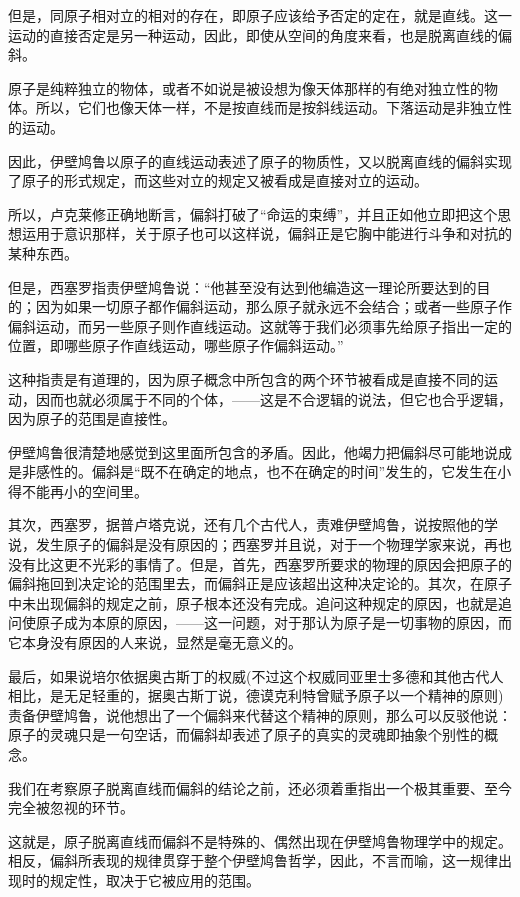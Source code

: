 \documentclass[a4paper,twoside,12pt,AutoFakeBold]{ctexart}
\begin{document}
但是，同原子相对立的相对的存在，即原子应该给予否定的定在，就是直线。这一运动的直接否定是另一种运动，因此，即使从空间的角度来看，也是脱离直线的偏斜。

原子是纯粹独立的物体，或者不如说是被设想为像天体那样的有绝对独立性的物体。所以，它们也像天体一样，不是按直线而是按斜线运动。下落运动是非独立性的运动。

因此，伊壁鸠鲁以原子的直线运动表述了原子的物质性，又以脱离直线的偏斜实现了原子的形式规定，而这些对立的规定又被看成是直接对立的运动。

所以，卢克莱修正确地断言，偏斜打破了“命运的束缚”，并且正如他立即把这个思想运用于意识那样，关于原子也可以这样说，偏斜正是它胸中能进行斗争和对抗的某种东西。

但是，西塞罗指责伊壁鸠鲁说：“他甚至没有达到他编造这一理论所要达到的目的；因为如果一切原子都作偏斜运动，那么原子就永远不会结合；或者一些原子作偏斜运动，而另一些原子则作直线运动。这就等于我们必须事先给原子指出一定的位置，即哪些原子作直线运动，哪些原子作偏斜运动。”

这种指责是有道理的，因为原子概念中所包含的两个环节被看成是直接不同的运动，因而也就必须属于不同的个体，——这是不合逻辑的说法，但它也合乎逻辑，因为原子的范围是直接性。

伊壁鸠鲁很清楚地感觉到这里面所包含的矛盾。因此，他竭力把偏斜尽可能地说成是非感性的。偏斜是“既不在确定的地点，也不在确定的时间”发生的，它发生在小得不能再小的空间里。

其次，西塞罗，据普卢塔克说，还有几个古代人，责难伊壁鸠鲁，说按照他的学说，发生原子的偏斜是没有原因的；西塞罗并且说，对于一个物理学家来说，再也没有比这更不光彩的事情了。但是，首先，西塞罗所要求的物理的原因会把原子的偏斜拖回到决定论的范围里去，而偏斜正是应该超出这种决定论的。其次，在原子中未出现偏斜的规定之前，原子根本还没有完成。追问这种规定的原因，也就是追问使原子成为本原的原因，——这一问题，对于那认为原子是一切事物的原因，而它本身没有原因的人来说，显然是毫无意义的。

最后，如果说培尔依据奥古斯丁的权威(不过这个权威同亚里士多德和其他古代人相比，是无足轻重的，据奥古斯丁说，德谟克利特曾赋予原子以一个精神的原则)责备伊壁鸠鲁，说他想出了一个偏斜来代替这个精神的原则，那么可以反驳他说：原子的灵魂只是一句空话，而偏斜却表述了原子的真实的灵魂即抽象个别性的概念。

我们在考察原子脱离直线而偏斜的结论之前，还必须着重指出一个极其重要、至今完全被忽视的环节。

这就是，原子脱离直线而偏斜不是特殊的、偶然出现在伊壁鸠鲁物理学中的规定。相反，偏斜所表现的规律贯穿于整个伊壁鸠鲁哲学，因此，不言而喻，这一规律出现时的规定性，取决于它被应用的范围。
\end{document}
